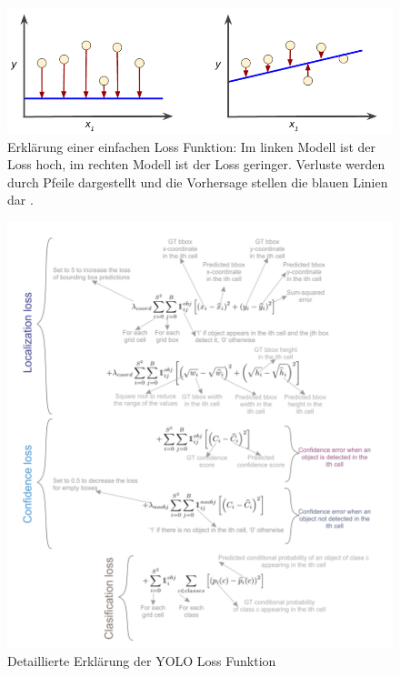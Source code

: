{    \begin{figure}[hb]
        \centering
        \includegraphics*[scale = 0.6, keepaspectratio, trim=2 2 2 2 ]{images/Loss_desc.png}
        \caption[Erklärung einer einfachen Loss Funktion]{Erklärung einer einfachen Loss Funktion: Im linken Modell ist der Loss hoch, im rechten Modell ist der Loss geringer. Verluste werden durch Pfeile dargestellt und die Vorhersage stellen die blauen Linien dar \citep{loss_google}. }
        \label{Loss_desc}
        \end{figure}
  
    \begin{figure}[h]
		\centering
		\includegraphics*[scale = 0.4, keepaspectratio]{images/YOLO/YOLO_loss_function_detail_expl.png}
		\caption[Detaillierte Erklärung der YOLO Loss Funktion]{Detaillierte Erklärung der YOLO Loss Funktion\citep{Terven2023}}
		\label{YOLO_loss_function_detail}
 	\end{figure}

}
